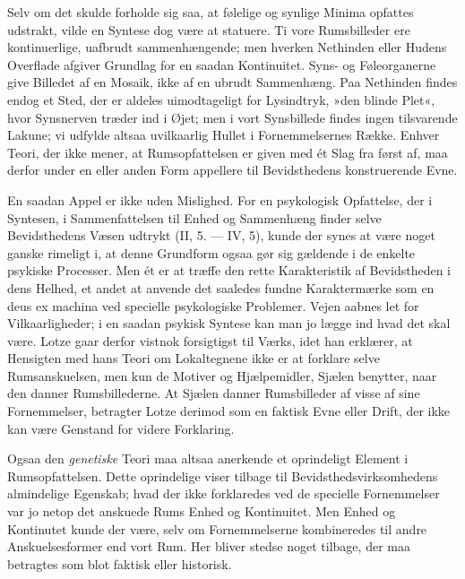 \documentclass[12pt,a4paper,openany]{book}
\newcommand{\opage}[1]{\marginnote{\footnotesize\textit{[#1]}}}
\begin{document}
Selv om det skulde forholde sig saa, at følelige og synlige Minima
opfattes udstrakt, vilde en Syntese dog være at statuere. Ti vore
Rumsbilleder ere kontinuerlige, uafbrudt sammenhængende; men hverken
Nethinden eller Hudens Overflade afgiver Grundlag for en saadan
Kontinuitet. Syns- og Føleorganerne give Billedet af en Mosaik, ikke af
en ubrudt Sammenhæng. Paa Nethinden findes endog et Sted, der er aldeles
uimodtageligt for Lysindtryk, »den blinde Plet«, hvor Synsnerven træder
ind i Øjet; men i vort Synsbillede findes ingen tilsvarende Lakune; vi
udfylde altsaa uvilkaarlig Hullet i Fornemmelsernes Række. Enhver Teori,
der ikke mener, at Rumsopfattelsen er given med ét Slag fra først af,
maa derfor under en eller anden Form appellere til Bevidsthedens
konstruerende Evne.


\opage{248}En saadan Appel er ikke uden Mislighed. For en psykologisk
Opfattelse, der i Syntesen, i Sammenfattelsen til Enhed og Sammenhæng
finder selve Bevidsthedens Væsen udtrykt (II, 5. --- IV, 5), kunde der
synes at være noget ganske rimeligt i, at denne Grundform ogsaa gør sig
gældende i de enkelte psykiske Processer. Men ét er at træffe den rette
Karakteristik af Bevidstheden i dens Helhed, et andet at anvende det
saaledes fundne Karaktermærke som en deus ex machina ved specielle
psykologiske Problemer. Vejen aabnes let for Vilkaarligheder; i en
saadan psykisk Syntese kan man jo lægge ind hvad det skal være. Lotze
gaar derfor vistnok forsigtigst til Værks, idet han erklærer, at
Hensigten med hans Teori om Lokaltegnene ikke er at forklare selve
Rumsanskuelsen, men kun de Motiver og Hjælpemidler, Sjælen benytter,
naar den danner Rumsbillederne. At Sjælen danner Rumsbilleder af visse
af sine Fornemmelser, betragter Lotze derimod som en faktisk Evne eller
Drift, der ikke kan være Genstand for videre Forklaring.

Ogsaa den \emph{genetiske} Teori maa altsaa anerkende et oprindeligt
Element i Rumsopfattelsen. Dette oprindelige viser tilbage til
Bevidsthedsvirksomhedens almindelige Egenskab; hvad der ikke forklaredes
ved de specielle Fornemmelser var jo netop det anskuede Rums Enhed og
Kontinuitet. Men Enhed og Kontinutet kunde der være, selv om
Fornemmelserne kombineredes til andre Anskuelsesformer end vort Rum. Her
bliver stedse noget tilbage, der maa betragtes som blot faktisk eller
historisk.
\end{document}
